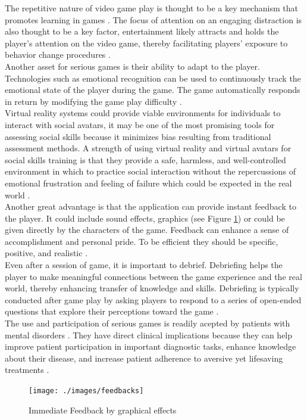 \documentclass[11pt]{article}
\begin{document}
The repetitive nature of video game play is thought to be a key mechanism that promotes learning in games \cite{Kato12}. The focus of attention on an engaging distraction is also thought to be a key factor, entertainment likely attracts and holds the player’s attention on the video game, thereby facilitating players’ exposure to behavior change procedures \cite{Thompson10}. \\

Another asset for serious games is their ability to adapt to the player. Technologies such as emotional recognition can be used to continuously track the emotional state of the player during the game. The game automatically responds in return by modifying the game play difficulty \cite{Fernandez12}. \\

Virtual reality systems could provide viable environments for individuals to interact with social avatars, it may be one of the most promising tools for assessing social skills because it minimizes bias resulting from traditional assessment methods. A strength of using virtual reality and virtual avatars for social skills training is that they provide a safe, harmless, and well-controlled environment in which to practice social interaction without the repercussions of emotional frustration and feeling of failure which could be expected in the real world \cite{Kim11}.\\

Another great advantage is that the application can provide instant feedback to the player. It could include sound effects, graphics (see Figure \ref{Figure Feedback}) or could be given directly by the characters of the game. Feedback can enhance a sense of accomplishment and personal pride. To be efficient they should be specific, positive, and realistic \cite{Thompson10}.\\

Even after a session of game, it is important to debrief. Debriefing helps the player to make meaningful connections between the game experience and the real world, thereby enhancing transfer of knowledge and skills. Debriefing is typically conducted after game play by asking players to respond to a series of open-ended questions that explore their perceptions toward the game \cite{Thompson10}.\\

The use and participation of serious games is readily acepted by patients with mental disorders \cite{Fernandez12}. They have direct clinical implications because they can help improve patient participation in important diagnostic tasks, enhance knowledge about their disease, and increase patient adherence to aversive yet lifesaving treatments \cite{Kato12}.
\begin{figure}[!h]
   	\centerline{\texttt{[image: ./images/feedbacks]}}
   	\caption{\label{Figure Feedback} Immediate Feedback by graphical effects \cite{Thompson10}}
\end{figure}
\end{document}
